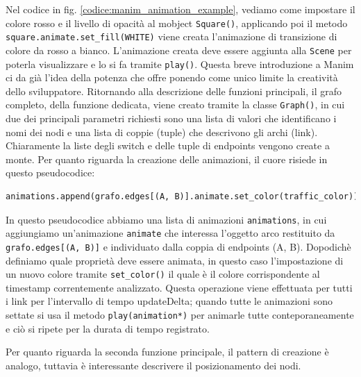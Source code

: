 \documentclass[binding=0.6cm]{sapthesis}
\begin{document}
Nel codice in fig. \ref{codice:manim_animation_example}, vediamo come impostare il colore rosso e il livello di opacità al mobject \lstinline|Square()|,
applicando poi il metodo \lstinline|square.animate.set_fill(WHITE)| viene creata l'animazione di transizione di colore da rosso a bianco.
L'animazione creata deve essere aggiunta alla \lstinline|Scene| per poterla visualizzare e lo si fa tramite \lstinline|play()|.
Questa breve introduzione a Manim ci da già l'idea della potenza che offre ponendo come unico limite la creatività dello sviluppatore.
Ritornando alla descrizione delle funzioni principali, il grafo completo, della funzione dedicata, viene creato tramite la classe
\lstinline|Graph()|, in cui due dei principali parametri richiesti sono una lista di valori che identificano i nomi dei nodi e una lista di coppie (tuple)
che descrivono gli archi (link). Chiaramente la liste degli switch e delle tuple di endpoints vengono create a monte. Per quanto riguarda
la creazione delle animazioni, il cuore risiede in questo pseudocodice:


{\scriptsize %
\begin{lstlisting}[language=Python, caption={Creazione animazione traffico}, label={codice:traffic_animation_example}]
animations.append(grafo.edges[(A, B)].animate.set_color(traffic_color))
\end{lstlisting}
}
In questo pseudocodice abbiamo una lista di animazioni \lstinline|animations|, in cui aggiungiamo un'animazione \lstinline|animate| che interessa l'oggetto arco 
restituito da \lstinline|grafo.edges[(A, B)]| e individuato dalla coppia di endpoints (A, B). Dopodichè definiamo quale proprietà deve essere animata,
 in questo caso l'impostazione di un nuovo colore tramite \lstinline|set_color()| il quale è il colore corrispondente al timestamp correntemente analizzato.
Questa operazione viene effettuata per tutti i link per l'intervallo di tempo updateDelta; quando tutte le animazioni sono settate si usa
il metodo \lstinline|play(animation*)| per animarle tutte conteporaneamente e ciò si ripete per la durata di tempo registrato.

Per quanto riguarda la seconda funzione principale, il pattern di creazione è analogo, tuttavia è interessante descrivere il posizionamento dei nodi.
\end{document}
